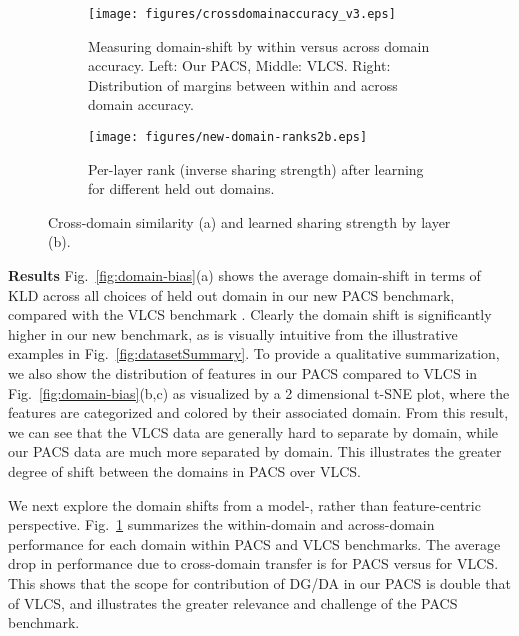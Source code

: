 \documentclass[10pt,twocolumn,letterpaper]{article}
\begin{document}
\begin{figure*}[t]
\centering
\begin{subfigure}{0.70\textwidth}
\texttt{[image: figures/crossdomainaccuracy\_v3.eps]}
\caption{Measuring domain-shift by within versus across domain accuracy. Left: Our PACS, Middle: VLCS. Right: Distribution of margins between within and across domain accuracy.}\label{fig:crossDomainAcc}
\end{subfigure}
\hspace{0.3cm}
\begin{subfigure}{0.26\textwidth}
\texttt{[image: figures/new-domain-ranks2b.eps]}
\caption{Per-layer rank (inverse sharing strength) after learning for different held out domains.}
\label{fig:sharing-strength}
\end{subfigure}
\caption{Cross-domain similarity (a) and learned sharing strength by layer (b).}
\end{figure*}







\vspace{0.2cm}\noindent\textbf{Results}\quad
Fig.~\ref{fig:domain-bias}(a) shows the average domain-shift in terms of KLD across all choices of held out domain in our new PACS benchmark, compared with the VLCS benchmark \cite{torralba2011dataset_bias}. Clearly the domain shift is significantly higher in our new benchmark, as is visually intuitive from the illustrative examples in Fig.~\ref{fig:datasetSummary}. To provide a qualitative summarization, we also show the distribution of features in our PACS compared to VLCS in Fig.~\ref{fig:domain-bias}(b,c) as visualized by a 2 dimensional t-SNE \cite{maaten2008visualizing} plot, where the features are categorized and colored by their associated domain. From this result, we can see that the VLCS data are generally hard to separate by domain, while our PACS data are much more separated by domain. This illustrates the greater degree of shift between the domains in PACS over VLCS. 



We next explore the domain shifts from a model-, rather than feature-centric perspective. Fig.~\ref{fig:crossDomainAcc} summarizes the within-domain and across-domain performance for each domain within PACS and VLCS benchmarks. The average drop in performance due to cross-domain transfer is  for PACS versus  for VLCS. This shows that the scope for contribution of DG/DA in our PACS is double that of VLCS, and illustrates the greater relevance and challenge of the PACS benchmark.
\end{document}
